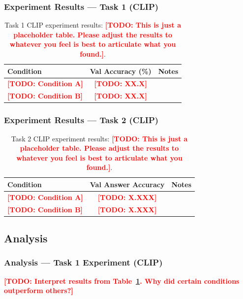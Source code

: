 \documentclass[11pt]{article}
\newcommand{\todo}[1]{\textcolor{red}{\textbf{[TODO: #1]}}}
\begin{document}
\subsubsection{Experiment Results — Task 1 (CLIP)}

\begin{table}[h]
  \centering
  \caption{Task 1 CLIP experiment results: \todo{This is just a placeholder table. Please adjust the results to whatever you feel is best to articulate what you found.}.}
  \label{tab:exp2_cls}
  \begin{tabular}{lcc}
    \toprule
    \textbf{Condition} & \textbf{Val Accuracy (\%)} & \textbf{Notes} \\
    \midrule
    \todo{Condition A}  & \todo{XX.X}  & \\
    \todo{Condition B}  & \todo{XX.X}  & \\
    \bottomrule
  \end{tabular}
\end{table}

\subsubsection{Experiment Results — Task 2 (CLIP)}

\begin{table}[h]
  \centering
  \caption{Task 2 CLIP experiment results: \todo{This is just a placeholder table. Please adjust the results to whatever you feel is best to articulate what you found.}.}
  \label{tab:exp2_gen}
  \begin{tabular}{lcc}
    \toprule
    \textbf{Condition} & \textbf{Val Answer Accuracy} & \textbf{Notes} \\
    \midrule
    \todo{Condition A}  & \todo{X.XXX}  & \\
    \todo{Condition B}  & \todo{X.XXX}  & \\
    \bottomrule
  \end{tabular}
\end{table}

\subsection{Analysis}

\subsubsection{Analysis — Task 1 Experiment (CLIP)}
\todo{Interpret results from Table~\ref{tab:exp2_cls}. Why did certain conditions outperform others?}
\end{document}
